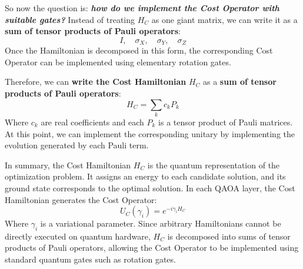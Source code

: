 \highspace
\textcolor{Green3}{} So now the question is: \textbf{\emph{how do we implement the Cost Operator with suitable gates?}} Instead of treating $H_C$ as one giant matrix, we can write it as a \textbf{sum of tensor products of Pauli operators}:
\begin{equation*}
    I, \quad \sigma_X, \quad \sigma_Y, \quad \sigma_Z
\end{equation*}
Once the Hamiltonian is decomposed in this form, the corresponding Cost Operator can be implemented using elementary rotation gates.

\highspace
Therefore, we can \textbf{write the Cost Hamiltonian} $H_C$ as a \textbf{sum of tensor products of Pauli operators}:
\begin{equation}
    H_C = \sum_k c_k P_k
\end{equation}
Where $c_k$ are real coefficients and each $P_k$ is a tensor product of Pauli matrices. At this point, we can implement the corresponding unitary by implementing the evolution generated by each Pauli term.

\highspace
In summary, the Cost Hamiltonian $H_C$ is the quantum representation of the optimization problem. It assigns an energy to each candidate solution, and its ground state corresponds to the optimal solution. In each QAOA layer, the Cost Hamiltonian generates the Cost Operator:
\begin{equation*}
    U_C\left(\gamma_i\right) = e^{-i \gamma_i H_C}
\end{equation*}
Where $\gamma_i$ is a variational parameter. Since arbitrary Hamiltonians cannot be directly executed on quantum hardware, $H_C$ is decomposed into sums of tensor products of Pauli operators, allowing the Cost Operator to be implemented using standard quantum gates such as rotation gates.